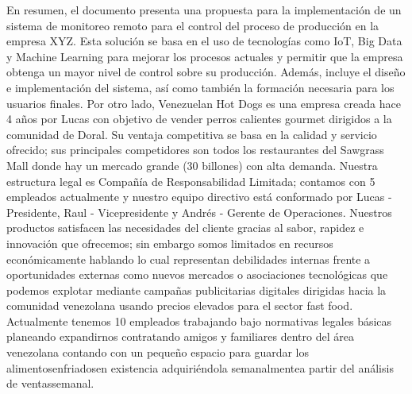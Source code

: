 
                En resumen, el documento presenta una propuesta para la implementación de un sistema de monitoreo remoto para el control del proceso de producción en la empresa XYZ. Esta solución se basa en el uso de tecnologías como IoT, Big Data y Machine Learning para mejorar los procesos actuales y permitir que la empresa obtenga un mayor nivel de control sobre su producción. Además, incluye el diseño e implementación del sistema, así como también la formación necesaria para los usuarios finales. Por otro lado, Venezuelan Hot Dogs es una empresa creada hace 4 años por Lucas con objetivo de vender perros calientes gourmet dirigidos a la comunidad de Doral. Su ventaja competitiva se basa en la calidad y servicio ofrecido; sus principales competidores son todos los restaurantes del Sawgrass Mall donde hay un mercado grande (30 billones) con alta demanda. Nuestra estructura legal es Compañía de Responsabilidad Limitada; contamos con 5 empleados actualmente y nuestro equipo directivo está conformado por Lucas - Presidente, Raul - Vicepresidente y Andrés - Gerente de Operaciones. Nuestros productos satisfacen las necesidades del cliente gracias al sabor, rapidez e innovación que ofrecemos; sin embargo somos limitados en recursos económicamente hablando lo cual representan debilidades internas frente a oportunidades externas como nuevos mercados o asociaciones tecnológicas que podemos explotar mediante campañas publicitarias digitales dirigidas hacia la comunidad venezolana usando precios elevados para el sector fast food. Actualmente tenemos 10 empleados trabajando bajo normativas legales básicas planeando expandirnos contratando amigos y familiares dentro del área venezolana contando con un pequeño espacio para guardar los alimentosenfriadosen existencia adquiriéndola semanalmentea partir del análisis de ventassemanal.
